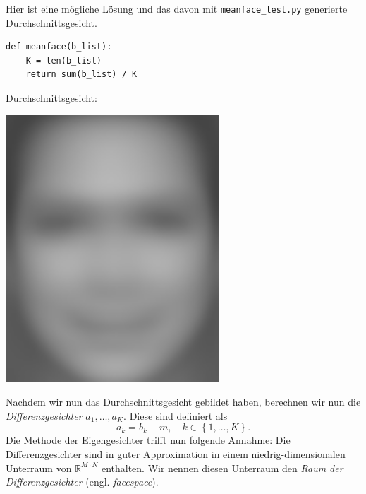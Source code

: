 \begin{losung*}
	Hier ist eine mögliche Lösung und das davon mit \texttt{meanface\_test.py} generierte Durchschnittsgesicht.\\[0.5cm]
	\begin{minipage}{0.45\textwidth}
\begin{lstlisting}[style=python]
def meanface(b_list):
	K = len(b_list)
	return sum(b_list) / K
\end{lstlisting}
	\end{minipage}\hfill
	\begin{minipage}{0.3\textwidth}\vspace{-1cm}
		\centering\hfill Durchschnittsgesicht:
	\end{minipage}
	\begin{minipage}{0.2\textwidth}\vspace{-1cm}
		\centering\includegraphics[width=0.6\textwidth]{images/facespace/meanface}
	\end{minipage}
\end{losung*}
Nachdem wir nun das Durchschnittsgesicht gebildet haben, berechnen wir nun die \textit{Differenzgesichter} $a_1,\ldots,a_K$.
Diese sind definiert als
\begin{equation*}
	a_k=b_k-m,\quad k\in\left\{1,\ldots,K\right\}.
\end{equation*}
Die Methode der Eigengesichter trifft nun folgende Annahme:
Die Differenzgesichter sind in guter Approximation in einem niedrig-dimensionalen Unterraum von $\mathbb R^{M\cdot N}$ enthalten.
Wir nennen diesen Unterraum den \textit{Raum der Differenzgesichter} (engl. \textit{facespace}).
